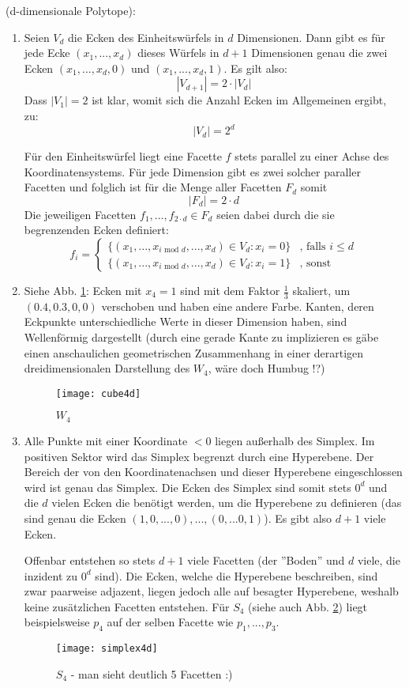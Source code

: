 \documentclass[a4paper, titlepage=false, parskip=full-, 10pt]{scrartcl}
\newcounter{tasknbr}
\newenvironment{task}[1]{{\bf Aufgabe \arabic {tasknbr}\stepcounter{tasknbr}} (#1):\begin{enumerate}}{\end{enumerate}}
\newcommand{\subtask}[1]{\item[#1)]}
\begin{document}
\begin{task}{d-dimensionale Polytope}
\subtask{a}
Seien $V_d$ die Ecken des Einheitswürfels in $d$ Dimensionen. Dann gibt es für jede Ecke $(x_1,...,x_d)$ dieses Würfels in $d+1$ Dimensionen genau die zwei Ecken $(x_1,...,x_d,0)$ und $(x_1,...,x_d,1)$. Es gilt also:
$$|V_{d+1}|=2\cdot |V_d|$$
Dass $|V_1|=2$ ist klar, womit sich die Anzahl Ecken im Allgemeinen ergibt, zu:
$$|V_d|=2^d$$ 

Für den Einheitswürfel liegt eine Facette $f$ stets parallel zu einer Achse des Koordinatensystems. Für jede Dimension gibt es zwei solcher paraller Facetten und folglich ist für die Menge aller Facetten $F_d$ somit
$$|F_d|=2\cdot d$$
Die jeweiligen Facetten $f_1,...,f_{2\cdot d}\in F_d$ seien dabei durch die sie begrenzenden Ecken definiert:
$$f_i=\begin{cases}
\{ (x_1,...,x_{i\text{ mod } d},...,x_d)\in V_d:x_i=0\}&\text{, falls }i\le d\\
\{ (x_1,...,x_{i\text{ mod }d},...,x_d)\in V_d:x_i=1\}&\text{, sonst}
\end{cases}$$

\subtask{b}
Siehe Abb. \ref{fig:2.b}: Ecken mit $x_4=1$ sind mit dem Faktor $\frac{1}{3}$ skaliert, um $(0.4,0.3,0,0)$ verschoben und haben eine andere Farbe. Kanten, deren Eckpunkte unterschiedliche Werte in dieser Dimension haben, sind Wellenförmig dargestellt (durch eine gerade Kante zu implizieren es gäbe einen anschaulichen geometrischen Zusammenhang in einer derartigen dreidimensionalen Darstellung des $W_4$, wäre doch Humbug !?)

\begin{figure}[h!]
\begin{center}
\texttt{[image: cube4d]}
\end{center}
\caption{$W_4$}
\label{fig:2.b}
\end{figure}

\subtask{c}
Alle Punkte mit einer Koordinate $<0$ liegen außerhalb des Simplex. Im positiven Sektor wird das Simplex begrenzt durch eine Hyperebene. Der Bereich der von den Koordinatenachsen und dieser Hyperebene eingeschlossen wird ist genau das Simplex. Die Ecken des Simplex sind somit stets $0^d$ und die $d$ vielen Ecken die benötigt werden, um die Hyperebene zu definieren (das sind genau die Ecken $(1,0,...,0),...,(0,...0,1)$). Es gibt also $d+1$ viele Ecken.

Offenbar entstehen so stets $d+1$ viele Facetten (der ''Boden'' und $d$ viele, die inzident zu $0^d$ sind). Die Ecken, welche die Hyperebene beschreiben, sind zwar paarweise adjazent, liegen jedoch alle auf besagter Hyperebene, weshalb keine zusätzlichen Facetten entstehen. Für $S_4$ (siehe auch Abb. \ref{fig:2.c}) liegt beispielsweise $p_4$ auf der selben Facette wie $p_1,...,p_3$.

\begin{figure}[h!]
\begin{center}
\texttt{[image: simplex4d]}
\end{center}
\caption{$S_4$ - man sieht deutlich 5 Facetten :)}
\label{fig:2.c}
\end{figure}
\end{task}
\end{document}
